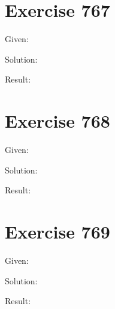 \documentclass[a4paper, 10pt]{scrartcl}
\begin{document}
\section{Exercise 767}

Given:

Solution:

Result:

\section{Exercise 768}

Given:

Solution:

Result:

\section{Exercise 769}

Given:

Solution:

Result:
\end{document}
